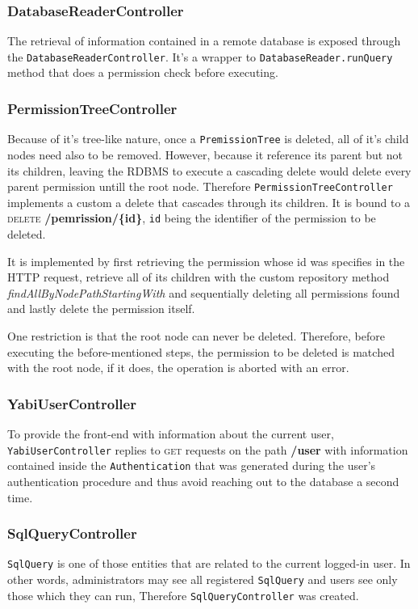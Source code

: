 \subsubsection{DatabaseReaderController}
The retrieval of information contained in a remote database is exposed through the \texttt{DatabaseReaderController}. It's a wrapper to \texttt{DatabaseReader.runQuery} method that does a permission check before executing.

\subsubsection{PermissionTreeController}
Because of it's tree-like nature, once a \texttt{PremissionTree} is deleted, all of it's child nodes need also to be removed. However, because it reference its parent but not its children, leaving the \gls{RDBMS} to execute a cascading delete would delete every parent permission untill the root node.
Therefore \texttt{PermissionTreeController} implements a custom a delete that cascades through its children. It is bound to a \textsc{delete} \textbf{/pemrission/\{id\}}, \texttt{id} being the identifier of the permission to be deleted.

It is implemented by first retrieving the permission whose id was specifies in the \gls{HTTP} request, retrieve all of its children with the custom repository method \textit{findAllByNodePathStartingWith} and sequentially deleting all permissions found and lastly delete the permission itself.

One restriction is that the root node can never be deleted. Therefore, before executing the before-mentioned steps, the permission to be deleted is matched with the root node, if it does, the operation is aborted with an error.

\subsubsection{YabiUserController}
To provide the front-end with information about the current user, \texttt{YabiUserController} replies to \textsc{get} requests on the path \textbf{/user} with information contained inside the \texttt{Authentication} that was generated during the user's authentication procedure and thus avoid reaching out to the database a second time.

\subsubsection{SqlQueryController}
\texttt{SqlQuery} is one of those entities that are related to the current logged-in user. In other words, administrators may see all registered \texttt{SqlQuery} and users see only those which they can run, Therefore \texttt{SqlQueryController} was created.

